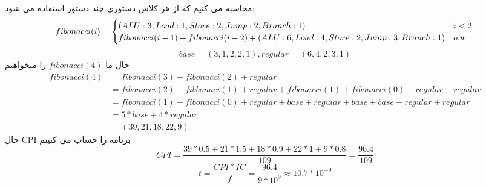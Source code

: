 محاسبه می کنیم که از هر کلاس دستوری چند دستور استفاده می شود:
\[
fibonacci(i)=
\begin{cases}
(ALU: 3, Load: 1, Store: 2, Jump: 2, Branch: 1) & i<2\\
fibonacci(i-1) + fibonacci(i-2) + (ALU: 6, Load: 4, Store: 2, Jump: 3, Branch: 1) & o.w
\end{cases}\\
\]
\begin{equation*}
base = (3, 1, 2, 2, 1),
regular = (6, 4, 2, 3, 1)
\end{equation*}
حال ما
$
fibonacci(4)
$
را میخواهیم
\begin{equation*}
  \begin{aligned}
    fibonacci(4) & = fibonacci(3) + fibonacci(2) + regular\\
      & = fibonacci(2) + fibbonaci(1) + regular + fibonacci(1) + fibonacci(0) + regular + regular\\
      & = fibonacci(1) + fibonacci(0) + regular + base + regular + base + base + regular + regular\\
      & = 5 * base + 4 * regular\\
      & = (39, 21, 18, 22, 9)
  \end{aligned}
\end{equation*}
حال
CPI
برنامه را حساب می کنینم
\begin{equation*}
  {CPI} = \frac{39*0.5 + 21*1.5 + 18*0.9 + 22*1 + 9*0.8}{109} = \frac{96.4}{109}
\end{equation*}
\begin{equation*}
  {t} = \frac{{CPI} * {IC}}{f} = \frac{96.4}{9 * 10^9} \approx 10.7 * 10^{-9}
\end{equation*}